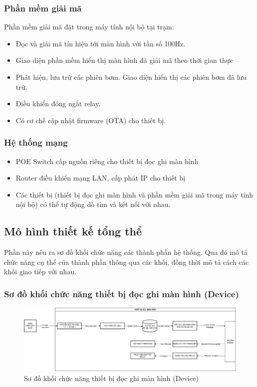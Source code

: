 \subsubsection{Phần mềm giải mã}

Phần mềm giải mã đặt trong máy tính nội bộ tại trạm:

\begin{itemize}
    \item Đọc và giải mã tín hiệu tới màn hình với tần số 100Hz.
    \item Giao diện phần mềm hiển thị màn hình đã giải mã theo thời gian thực
    \item Phát hiện, lưu trữ các phiên bơm. Giao diện hiển thị các phiên bơm đã lưu trữ.
    \item Điều khiển đóng ngắt relay.
    \item Có cơ chế cập nhật firmware (OTA) cho thiết bị.    
\end{itemize}

\subsubsection{Hệ thống mạng}

\begin{itemize}
    \item POE Switch cấp nguồn riêng cho thiết bị đọc ghi màn hình
    \item Router điều khiển mạng LAN, cấp phát IP cho thiết bị
    \item Các thiết bị (thiết bị đọc ghi màn hình và phần mềm giải mã trong máy tính nội bộ) có thể tự động dò tìm và kết nối với nhau.
\end{itemize}

\subsection{Mô hình thiết kế tổng thể}

Phần này nêu ra sơ đồ khối chức năng các thành phần hệ thống. Qua đó mô tả chức năng cụ thể của thành phần thông qua các khối, đồng thời mô tả cách các khối giao tiếp với nhau.

\subsubsection{Sơ đồ khối chức năng thiết bị đọc ghi màn hình (Device)}

\begin{figure}[!ht]
    \centering
    \includegraphics[width=1.0\linewidth]{Figures/Chap3_Device-FunctionBlock.png}
    \caption{Sơ đồ khối chức năng thiết bị đọc ghi màn hình (Device)}
    \label{fig:hinh3.2}
\end{figure}

